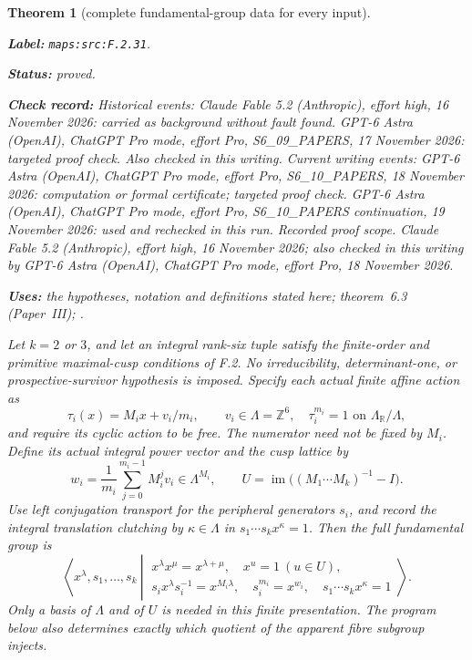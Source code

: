 \documentclass[11pt,a4paper]{article}
\newtheorem{theorem}{Theorem}[section]
\theoremstyle{definition}
\newcommand{\StatementRecord}[4]{\par\smallskip\begingroup\upshape\raggedright\noindent\textbf{Label:} \nolinkurl{#1}.\par\noindent\textbf{Status:} #2.\par\noindent\textbf{Check record:} #3.\par\noindent\textbf{Uses:} #4.\par\endgroup\smallskip}
\newcommand{\ExternalPaperRef}[3]{\ifmmode\text{\upshape #1#2 (Paper~#3)}\else #1#2 (Paper~#3)\fi}
\begin{document}
\begin{theorem}[complete fundamental-group data for every input]\label{maps:src:F.2.31}
\StatementRecord{maps:src:F.2.31}{proved}{Historical events: Claude Fable 5.2 (Anthropic), effort high, 16 November 2026: carried as background without fault found. GPT-6 Astra (OpenAI), ChatGPT Pro mode, effort Pro, S6\_09\_PAPERS, 17 November 2026: targeted proof check. Also checked in this writing. Current writing events: GPT-6 Astra (OpenAI), ChatGPT Pro mode, effort Pro, S6\_10\_PAPERS, 18 November 2026: computation or formal certificate; targeted proof check. GPT-6 Astra (OpenAI), ChatGPT Pro mode, effort Pro, S6\_10\_PAPERS continuation, 19 November 2026: used and rechecked in this run. \emph{Recorded proof scope.} Claude Fable 5.2 (Anthropic), effort high, 16 November 2026; also checked in this writing by GPT-6 Astra (OpenAI), ChatGPT Pro mode, effort Pro, 18 November 2026}{the hypotheses, notation and definitions stated here; \ExternalPaperRef{theorem~}{6.3}{III}; \cite[Theorems 2.3--2.4, p.~425; Euler-characteristic comparison, pp.~427--428]{rootScott83}}


Let $k=2$ or $3$, and let an integral rank-six tuple satisfy the
finite-order and primitive maximal-cusp conditions of F.2.  No
irreducibility, determinant-one, or prospective-survivor hypothesis is
imposed.  Specify each actual finite affine action as
\[
 \tau_i(x)=M_ix+v_i/m_i,\qquad v_i\in\Lambda=\mathbb Z^6,
 \quad \tau_i^{m_i}=1\text{ on }\Lambda_{\mathbb R}/\Lambda,
 \tag{F.G1}\label{maps:eq:F.G1}
\]
and require its cyclic action to be free.  The numerator need not be
fixed by $M_i$.  Define its actual integral power vector and the cusp
lattice by
\[
 w_i=\frac1{m_i}\sum_{j=0}^{m_i-1}M_i^jv_i\in\Lambda^{M_i},
 \qquad U=\operatorname{im}\bigl((M_1\cdots M_k)^{-1}-I\bigr).
 \tag{F.G2}\label{maps:eq:F.G2}
\]
Use left conjugation transport for the peripheral generators $s_i$,
and record the integral translation clutching by $\kappa\in\Lambda$
in $s_1\cdots s_kx^\kappa=1$.  Then the full fundamental group is
\[
 \left\langle x^\lambda,s_1,\ldots,s_k\ \left|\
 \begin{array}{l}
 x^\lambda x^\mu=x^{\lambda+\mu},\quad x^u=1\ (u\in U),\\
 s_ix^\lambda s_i^{-1}=x^{M_i\lambda},\quad
 s_i^{m_i}=x^{w_i},\quad s_1\cdots s_kx^\kappa=1
 \end{array}\right.\right\rangle .                         \tag{F.G3}\label{maps:eq:F.G3}
\]
Only a basis of $\Lambda$ and of $U$ is needed in this finite
presentation.  The program below also determines exactly which
quotient of the apparent fibre subgroup injects.


\end{theorem}
\end{document}
